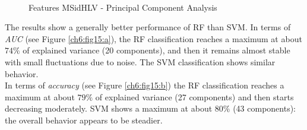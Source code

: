 \begin{figure}[!htb]
  \centering
    \\
    \caption{Features MSidHLV - Principal Component Analysis}
    \label{ch6:fig15}
\end{figure}

The results show a generally better performance of \Gls{RF} than \Gls{SVM}. In terms of \textit{AUC} (see Figure \ref{ch6:fig15:a}), the \Gls{RF} classification reaches
a maximum at about $74\%$ of explained variance (20 components), and then it remains almost stable with small fluctuations due to noise.
The \Gls{SVM} classification shows similar behavior.\\
In terms of \textit{accuracy} (see Figure \ref{ch6:fig15:b}) the \Gls{RF} classification reaches a maximum at about $79\%$ of explained variance (27 components)
and then starts decreasing moderately. \Gls{SVM} shows a maximum at about $80\%$ (43 components): the overall behavior appears to be steadier.

